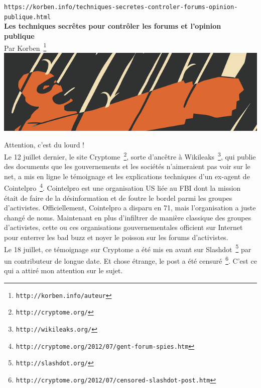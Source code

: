 \documentclass[11pt,twoside,a4paper]{article}
\begin{document}
\setlength\parindent{0pt}

\texttt{https://korben.info/techniques-secretes-controler-forums-opinion-publique.html}~\\

\textbf{\LARGE Les techniques secr{\^e}tes pour contr{\^o}ler les forums et l'opinion publique}~\\

Par Korben~\footnote{\texttt{http://korben.info/auteur}}~\\

\includegraphics[width=\textwidth]{img/wallpaper-309126.png}

Attention, c'est du lourd !~\\

Le 12 juillet dernier, le site Cryptome~\footnote{\texttt{http://cryptome.org/}}, sorte d'anc{\^e}tre {\`a} Wikileaks~\footnote{\texttt{http://wikileaks.org/}}, qui publie des documents que les gouvernements et les soci{\'e}t{\'e}s n'aimeraient pas voir sur le net, a mis en ligne le t{\'e}moignage et les explications techniques d'un ex-agent de Cointelpro~\footnote{\texttt{http://cryptome.org/2012/07/gent-forum-spies.htm}}. Cointelpro est une organisation US li{\'e}e au FBI dont la mission {\'e}tait de faire de la d{\'e}sinformation et de foutre le bordel parmi les groupes d'activistes. Officiellement, Cointelpro a disparu en 71, mais l'organisation a juste chang{\'e} de noms. Maintenant en plus d'infiltrer de mani{\`e}re classique des groupes d'activistes, cette ou ces organisations gouvernementales officient sur Internet pour enterrer les bad buzz et noyer le poisson sur les forums d'activistes.~\\

Le 18 juillet, ce t{\'e}moignage sur Cryptome a {\'e}t{\'e} mis en avant sur Slashdot~\footnote{\texttt{http://slashdot.org/}} par un contributeur de longue date. Et chose {\'e}trange, le post a {\'e}t{\'e} censur{\'e}~\footnote{\texttt{http://cryptome.org/2012/07/censored-slashdot-post.htm}}. C'est ce qui a attir{\'e} mon attention sur le sujet.~\\
\end{document}
